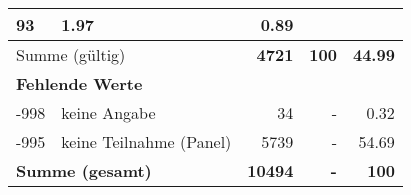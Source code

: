 \begin{longtable}{lXrrr}
       \num{93} &
       \num[round-mode=places,round-precision=2]{1.97} &
         \num[round-mode=places,round-precision=2]{0.89} \\
     \midrule
     \multicolumn{2}{l}{Summe (gültig)} &
       \textbf{\num{4721}} &
     \textbf{\num{100}} &
       \textbf{\num[round-mode=places,round-precision=2]{44.99}} \\
     \multicolumn{5}{l}{\textbf{Fehlende Werte}}\\
       -998 &
       keine Angabe &
         \num{34} &
        - &
         \num[round-mode=places,round-precision=2]{0.32} \\
       -995 &
       keine Teilnahme (Panel) &
         \num{5739} &
        - &
         \num[round-mode=places,round-precision=2]{54.69} \\
     \midrule
     \multicolumn{2}{l}{\textbf{Summe (gesamt)}} &
          \textbf{\num{10494}} &
        \textbf{-} &
        \textbf{\num{100}} \\
     \bottomrule
     \end{longtable}
     
